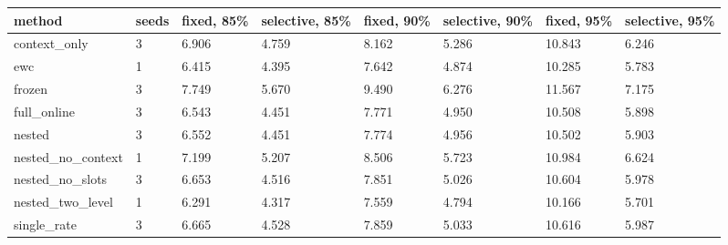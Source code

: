 \begin{tabular}{llllllll}
\hline
method & seeds & fixed, 85\% & selective, 85\% & fixed, 90\% & selective, 90\% & fixed, 95\% & selective, 95\% \\
\hline
context\_only & 3 & 6.906 & 4.759 & 8.162 & 5.286 & 10.843 & 6.246 \\
ewc & 1 & 6.415 & 4.395 & 7.642 & 4.874 & 10.285 & 5.783 \\
frozen & 3 & 7.749 & 5.670 & 9.490 & 6.276 & 11.567 & 7.175 \\
full\_online & 3 & 6.543 & 4.451 & 7.771 & 4.950 & 10.508 & 5.898 \\
nested & 3 & 6.552 & 4.451 & 7.774 & 4.956 & 10.502 & 5.903 \\
nested\_no\_context & 1 & 7.199 & 5.207 & 8.506 & 5.723 & 10.984 & 6.624 \\
nested\_no\_slots & 3 & 6.653 & 4.516 & 7.851 & 5.026 & 10.604 & 5.978 \\
nested\_two\_level & 1 & 6.291 & 4.317 & 7.559 & 4.794 & 10.166 & 5.701 \\
single\_rate & 3 & 6.665 & 4.528 & 7.859 & 5.033 & 10.616 & 5.987 \\
\hline
\end{tabular}
